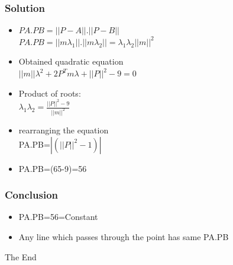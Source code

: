 \documentclass{beamer}
\begin{document}
\begin{frame}
\frametitle{Solution}
\begin{itemize}
\item $PA.PB=||P-A||.||P-B||$\\
$PA.PB=||m\lambda_1||.||m\lambda_2||=\lambda_1\lambda_2||m||^2$
\item Obtained quadratic equation\\
$||m||\lambda^2+2P^Tm\lambda+||P||^2-9=0$
\item Product of roots:\\
$\lambda_1\lambda_2=\frac{||P||^2-9}{||m||^2}$
\item rearranging the equation\\
PA.PB=$|(||P||^2-1)|$
\item PA.PB=(65-9)=56
\end{itemize}
\end{frame}

\begin{frame}
\frametitle{Conclusion}
\begin{itemize}
\item PA.PB=56=Constant
\item Any line which passes through the point has same PA.PB
\end{itemize}
\end{frame}


\begin{frame}
\Huge{\centerline{The End}}
\end{frame}
\end{document}
